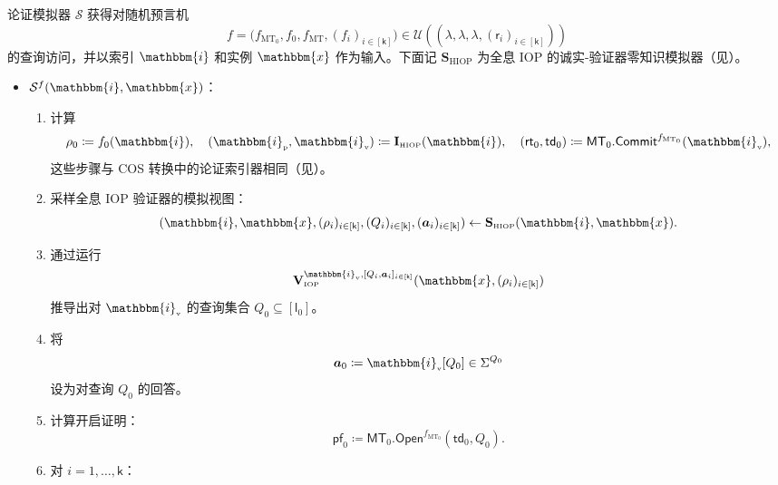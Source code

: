 \documentclass[american,singlepageview]{snargs-book-zh}
\newcommand{\DefineEqual}{\coloneqq}
\renewcommand{\vec}[1]{\bm{#1}}
\newcommand{\Index}{\mathbbm{i}}
\newcommand{\Instance}{\mathbbm{x}}
\newcommand{\ProtoIndexer}{I}
\newcommand{\ProtoVerifier}{V}
\newcommand{\ProtoSimulator}{S}
\newcommand{\ProtoAlphabet}{\Sigma}
\newcommand{\ProtoRoundComplexity}{\mathsf{k}}
\newcommand{\ProtoProofLength}{\mathsf{l}}
\newcommand{\ProtoRandomnessComplexity}{\mathsf{r}}
\newcommand{\RoundIndex}{i}
\newcommand{\PCPEntry}{a}
\newcommand{\PCPEntries}{\vec{\PCPEntry}}
\newcommand{\IOPSubscript}{\scriptscriptstyle\mathrm{IOP}}
\newcommand{\IOPFormat}[1]{\mathbf{#1}}
\newcommand{\IOPVerifier}{\IOPFormat{\ProtoVerifier}_{\IOPSubscript}}
\newcommand{\IOPEntry}{a}
\newcommand{\IOPEntries}{\vec{\IOPEntry}}
\newcommand{\IOPQuerySet}{Q}
\newcommand{\IOPVerifierRandomMessage}{\rho}
\newcommand{\IOPRoundComplexity}{\ProtoRoundComplexity}
\newcommand{\IOPAlphabet}{\ProtoAlphabet}
\newcommand{\IOPProofLength}{\ProtoProofLength}
\newcommand{\IOPRandomnessComplexity}{\ProtoRandomnessComplexity}
\newcommand{\IOPVerifierRandomMessages}{(\IOPVerifierRandomMessage_{\RoundIndex})_{\RoundIndex \in [\IOPRoundComplexity]}}
\newcommand{\IOPTuple}[1]{(#1_{\RoundIndex})_{\RoundIndex \in [\IOPRoundComplexity]}}
\newcommand{\IOPVerifierInput}{\Instance,\IOPVerifierRandomMessages}
\newcommand{\IOPLocalView}[2]{[#1_{\RoundIndex},#2_{\RoundIndex}]_{\RoundIndex \in [\IOPRoundComplexity]}}
\newcommand{\HIOPSubscript}{\scriptscriptstyle\mathrm{HIOP}}
\newcommand{\HIOPIndexer}{\IOPFormat{\ProtoIndexer}_{\HIOPSubscript}}
\newcommand{\ProverEncodedIndex}{\Index_{{\scriptscriptstyle\mathrm{p}}}}
\newcommand{\VerifierEncodedIndex}{\Index_{{\scriptscriptstyle\mathrm{v}}}}
\newcommand{\HIOPSimulator}{\IOPFormat{\ProtoSimulator}_{\HIOPSubscript}}
\newcommand{\HIOPPublicSampledView}{(\Index,\Instance,\IOPVerifierRandomMessages,\IOPTuple{\IOPQuerySet},\IOPTuple{\PCPEntries})}
\newcommand{\ARGFormat}[1]{\mathcal{#1}}
\newcommand{\ARGSimulator}{\ARGFormat{\ProtoSimulator}}
\newcommand{\IndexRoundSubscript}{0}
\newcommand{\ROFunction}{f}
\newcommand{\RODistribution}[1]{\mathcal{U}(#1)}
\newcommand{\SecurityParameter}{\lambda}
\newcommand{\ROTreeSymbol}{\MTSubscript}
\newcommand{\ROTreeFunction}{\ROFunction_{\ROTreeSymbol}}
\newcommand{\RORandRoundFunction}[1]{\ROFunction_{#1}}
\newcommand{\MTSymbol}{\mathsf{MT}}
\newcommand{\MTSubscript}{{\scriptscriptstyle\mathrm{MT}}}
\newcommand{\MTCommitment}{\mathsf{rt}}
\newcommand{\MTTrapdoor}{\mathsf{td}}
\newcommand{\MTProof}{\mathsf{pf}}
\newcommand{\MTIdxCommit}[1]{\MTSymbol_{#1}.\mathsf{Commit}}
\newcommand{\MTIdxOpen}[1]{\MTSymbol_{#1}.\mathsf{Open}}
\newcommand{\HashedIndex}{\IOPVerifierRandomMessage_{\IndexRoundSubscript}}
\newcommand{\ROIndexHashFunction}{\ROFunction_{\IndexRoundSubscript}}
\newcommand{\ROIndexTreeFunction}{\ROFunction_{\ROTreeSymbol_{\IndexRoundSubscript}}}
\begin{document}
\begin{construction}
\label{construction:cos-simulator}
论证模拟器 $\ARGSimulator$ 获得对随机预言机
\[
\ROFunction
=
\bigl(\ROIndexTreeFunction,\ROIndexHashFunction,\ROTreeFunction,(\RORandRoundFunction{\RoundIndex})_{\RoundIndex \in [\IOPRoundComplexity]}\bigr)
\in
\RODistribution{(\SecurityParameter,\SecurityParameter,\SecurityParameter,\IOPTuple{\IOPRandomnessComplexity})}
\]
的查询访问，并以索引 $\Index$ 和实例 $\Instance$ 作为输入。下面记 $\HIOPSimulator$ 为全息 IOP 的诚实-验证器零知识模拟器（见）。

\begin{itemize}
  \item $\ARGSimulator^{\ROFunction}(\Index,\Instance)$：
    \begin{enumerate}[nolistsep]
      \item 计算
      \[
        \HashedIndex \DefineEqual \ROIndexHashFunction(\Index),\quad
        (\ProverEncodedIndex,\VerifierEncodedIndex) \DefineEqual \HIOPIndexer(\Index),\quad
        (\MTCommitment_{\IndexRoundSubscript},\MTTrapdoor_{\IndexRoundSubscript})
        \DefineEqual
        \MTIdxCommit{\IndexRoundSubscript}^{\ROIndexTreeFunction}(\VerifierEncodedIndex),
      \]
      这些步骤与 COS 转换中的论证索引器相同（见）。
      \item \label{step:cos-zksimulator:sample-view}
      采样全息 IOP 验证器的模拟视图：
      \[
        \HIOPPublicSampledView \gets \HIOPSimulator(\Index,\Instance).
      \]
      \item 通过运行
      \[
        \IOPVerifier^{\VerifierEncodedIndex,\IOPLocalView{\IOPQuerySet}{\IOPEntries}}(\IOPVerifierInput)
      \]
      推导出对 $\VerifierEncodedIndex$ 的查询集合
      $\IOPQuerySet_{\IndexRoundSubscript} \subseteq [\IOPProofLength_{\IndexRoundSubscript}]$。
      \item 将
      \[
        \IOPEntries_{\IndexRoundSubscript}
        \DefineEqual
        \VerifierEncodedIndex[\IOPQuerySet_{\IndexRoundSubscript}]
        \in
        \IOPAlphabet^{\IOPQuerySet_{\IndexRoundSubscript}}
      \]
      设为对查询 $\IOPQuerySet_{\IndexRoundSubscript}$ 的回答。
      \item 计算开启证明：
      \[
        \MTProof_{\IndexRoundSubscript}
        \DefineEqual
        \MTIdxOpen{\IndexRoundSubscript}^{\ROIndexTreeFunction}
        (\MTTrapdoor_{\IndexRoundSubscript},\IOPQuerySet_{\IndexRoundSubscript}).
      \]
      \item 对 $\RoundIndex = 1,\dots,\IOPRoundComplexity$：

\end{enumerate}
\end{itemize}
\end{construction}
\end{document}
